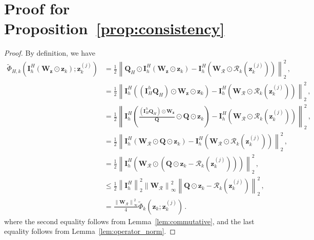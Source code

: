 \documentclass{article}
\numberwithin{equation}{section}
\begin{document}
\section{Proof for Proposition~\ref{prop:consistency}}\label{app:proof_consistency}
\begin{proof}
By definition, we have
\begin{equation*}
    \begin{aligned}
        \widetilde{\Phi}_{H,k}\left(\bm{I}_h^H\left(\bm{W}_{\bm{z}}\odot\bm{z}_{k}\right); \bm{z}_k^{(j)}\right)
        &= \frac{1}{2} \left\|\bm{Q}_H\odot\bm{I}_h^H\left(\bm{W}_{\bm{z}}\odot\bm{z}_k\right)- \bm{I}_h^H\left(\bm{W}_{\mathcal{R}}\odot\mathcal{R}_k\left(\bm{z}_k^{(j)}\right)\right) \right\|_2^2\,,\\  
        &= \frac{1}{2} \left\|\bm{I}_h^H\left((\bm{I}_H^h\bm{Q}_H)\odot\bm{W}_{\bm{z}}\odot\bm{z}_k\right)- \bm{I}_h^H\left(\bm{W}_{\mathcal{R}}\odot\mathcal{R}_k\left(\bm{z}_k^{(j)}\right)\right) \right\|_2^2\,,\\  
        &=\frac{1}{2} \left\|\bm{I}_h^H\left(\frac{(\bm{I}_H^h\bm{Q}_H)\odot\bm{W}_{\bm{z}}}{\bm{Q}}\odot\bm{Q}\odot \bm{z}_k\right)- \bm{I}_h^H\left(\bm{W}_{\mathcal{R}}\odot\mathcal{R}_k\left(\bm{z}_k^{(j)}\right)\right) \right\|_2^2\,,\\    
        &=\frac{1}{2} \left\|\bm{I}_h^H\left(\bm{W}_{\mathcal{R}}\odot\bm{Q}\odot \bm{z}_k\right)- \bm{I}_h^H\left(\bm{W}_{\mathcal{R}}\odot\mathcal{R}_k\left(\bm{z}_k^{(j)}\right)\right) \right\|_2^2\,,\\ 
        &=\frac{1}{2} \left\|\bm{I}_h^H\left(\bm{W}_{\mathcal{R}}\odot\left(\bm{Q}\odot \bm{z}_k-\mathcal{R}_k\left(\bm{z}_k^{(j)}\right)\right)\right)\right\|_2^2\,,\\ 
        &\leq \frac{1}{2}\left\|\bm{I}_h^H\right\|_2^2\left\|\bm{W}_{\mathcal{R}}\right\|_{\infty}^2\left\|\bm{Q}\odot \bm{z}_k- \mathcal{R}_k\left(\bm{z}_k^{(j)}\right)\right\|_2^2\,,\\
        &=\frac{\left\|\bm{W}_{\mathcal{R}}\right\|_{\infty}^2}{4}\widetilde{\Phi}_k\left(\bm{z}_{k}; \bm{z}_k^{(j)}\right)\,.
    \end{aligned}
\end{equation*}
where the second equality follows from Lemma~\ref{lem:commutative}, and the last equality follows from Lemma~\ref{lem:operator_norm}.


\end{proof}
\end{document}

